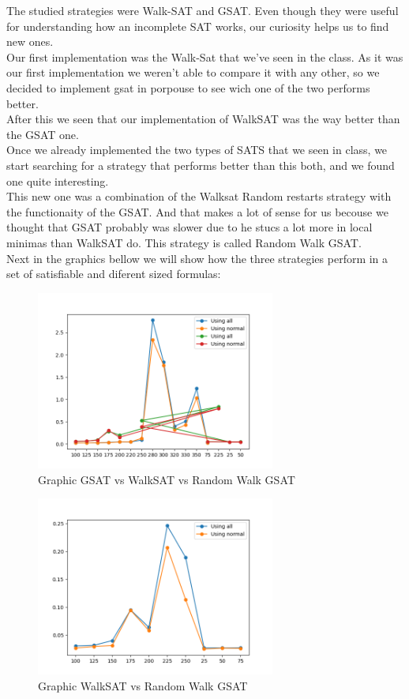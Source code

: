 
The studied strategies were Walk-SAT and GSAT. Even though they were useful for understanding how an incomplete SAT works, our curiosity helps us to find new ones.\\
Our first implementation was the Walk-Sat that we've seen in the class. As it was our first implementation we weren't able to compare it with any other, so we decided to implement gsat in porpouse to see wich one of the two performs better.\\
After this we seen that our implementation of WalkSAT was the way better than the GSAT one.\\
Once we already implemented the two types of SATS that we seen in class, we start searching for a strategy that performs better than this both, and we found one quite interesting.\\
This new one was a combination of the Walksat Random restarts strategy with the functionaity of the GSAT. And that makes a lot of sense for us becouse we thought that GSAT probably was slower due to he stucs a lot more in local minimas than WalkSAT do. This strategy is called Random Walk GSAT.\\
Next in the graphics bellow we will show how the three strategies perform in a set of satisfiable and diferent sized formulas:
\begin{figure}
	\centering
		\includegraphics[width=0.7\textwidth]{50-graphic-2.png}
	\caption{Graphic GSAT vs WalkSAT vs Random Walk GSAT }
\end{figure}
\begin{figure}
	\centering
		\includegraphics[width=0.7\textwidth]{50-graphic-1.png}
	\caption{Graphic WalkSAT vs Random Walk GSAT }
\end{figure}


